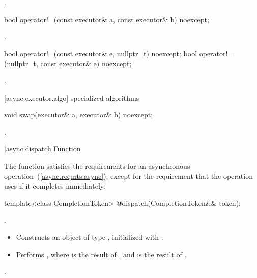 \begin{itemdescr}
\pnum
\returns {}.
\end{itemdescr}

\begin{itemdecl}
bool operator!=(const executor& a, const executor& b) noexcept;
\end{itemdecl}

\begin{itemdescr}
\pnum
\returns {}.
\end{itemdescr}

\begin{itemdecl}
bool operator!=(const executor& e, nullptr_t) noexcept;
bool operator!=(nullptr_t, const executor& e) noexcept;
\end{itemdecl}

\begin{itemdescr}
\pnum
\returns {}.
\end{itemdescr}



[async.executor.algo]{ specialized algorithms}

\begin{itemdecl}
void swap(executor& a, executor& b) noexcept;
\end{itemdecl}

\begin{itemdescr}
\pnum
\effects {}.
\end{itemdescr}




[async.dispatch]{Function }

\pnum
\begin{note} The function  satisfies the requirements for an asynchronous operation~(\ref{async.reqmts.async}), except for the requirement that the operation uses  if it completes immediately. \end{note}

\begin{itemdecl}
template<class CompletionToken>
  @\DEDUCED@ dispatch(CompletionToken&& token);
\end{itemdecl}

\begin{itemdescr}
\pnum
\completionsig {}.

\pnum
\effects 
\begin{itemize}
\item
 Constructs an object  of type , initialized with .
\item
 Performs , where  is the result of , and  is the result of .
\end{itemize}

\pnum
\returns {}.
\end{itemdescr}

